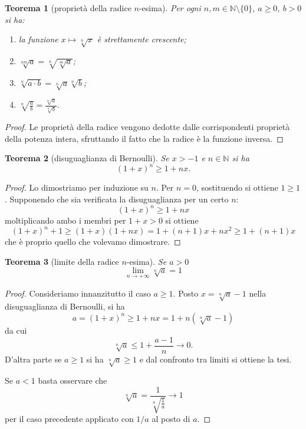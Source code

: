 \documentclass[italian,a4paper,oneside,headinclude]{scrbook}
\newcommand{\NN}{\mathbb N}
\newtheorem{theorem}{Teorema}
\begin{document}
\begin{theorem}[proprietà della radice $n$-esima]
Per ogni $n,m \in \NN\setminus\{0\}$, $a\ge 0$, $b>0$ si ha:
\begin{enumerate}
\item la funzione $x\mapsto \sqrt[n]{x}$ è strettamente crescente;
\item $\displaystyle \sqrt[nm]{a} = \sqrt[n]{\sqrt[m]{a}}$;
\item $\displaystyle \sqrt[n]{a\cdot b} = \sqrt[n]{a}\sqrt[n]{b}$;
\item $\displaystyle \sqrt[n]{\frac a b} = \frac{\sqrt[n]{a}}{\sqrt[n]{b}}$.
\end{enumerate}
\end{theorem}

\begin{proof}
Le proprietà della radice vengono dedotte dalle corrispondenti proprietà
della potenza intera, sfruttando il fatto che la radice è la funzione inversa.
\end{proof}

\begin{theorem}[disuguaglianza di Bernoulli]
Se $x > -1$ e $n\in \NN$ si ha
\[
(1+x)^n \ge 1 + nx.
\]
\end{theorem}
%
\begin{proof}
Lo dimostriamo per induzione su $n$. Per $n=0$, sostituendo si ottiene $1\ge 1$.
Supponendo che sia verificata la disuguaglianza per un certo $n$:
\[
(1+x)^n \ge 1 + nx
\]
moltiplicando ambo i membri per $1+x > 0$ si ottiene
\[
(1+x)^n+1 \ge (1+x) (1+nx) = 1 + (n+1)x + n x^2
\ge 1 + (n+1)x
\]
che è proprio quello che volevamo dimostrare.
\end{proof}

\begin{theorem}[limite della radice $n$-esima]
Se $a>0$
\[
   \lim_{n\to +\infty} \sqrt[n]{a} = 1
\]
\end{theorem}
%
\begin{proof}
Consideriamo innanzitutto il caso $a\ge 1$.
Posto $x=\sqrt[n]{a}-1$ nella disuguaglianza di Bernoulli, si ha
\[
a
= (1+x)^n
\ge 1 + nx
= 1 + n (\sqrt[n]{a}-1)
\]
da cui
\[
 \sqrt[n]{a} \le 1 + \frac{a-1}{n} \to 0.
\]
D'altra parte se $a\ge 1$ si ha $\sqrt[n]{a} \ge 1$
e dal confronto tra limiti si ottiene la tesi.

Se $a<1$ basta osservare che
\[
\sqrt[n]{a} = \frac{1}{\sqrt[n]{\frac 1 a}} \to 1
\]
per il caso precedente applicato con $1/a$ al posto di $a$.
\end{proof}
\end{document}
